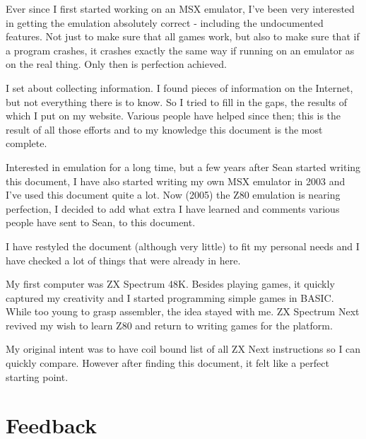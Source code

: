 \documentclass[twoside,openright,a4paper]{book}
\begin{document}
\begin{description}[style=unboxed,leftmargin=0cm]

	\item[Sean]\hfill
	
	Ever since I first started working on an MSX emulator, I've been very interested in getting the emulation absolutely correct - including the undocumented features. Not just to make sure that all games work, but also to make sure that if a program crashes, it crashes exactly the same way if running on an emulator as on the real thing. Only then is perfection achieved.

	I set about collecting information. I found pieces of information on the Internet, but not everything there is to know. So I tried to fill in the gaps, the results of which I put on my website. Various people have helped since then; this is the result of all those efforts and to my knowledge this document is the most complete.

	\item[Jan]\hfill

	Interested in emulation for a long time, but a few years after Sean started writing this document, I have also started writing my own MSX emulator in 2003 and I've used this document quite a lot. Now (2005) the Z80 emulation is nearing perfection, I decided to add what extra I have learned and comments various people have sent to Sean, to this document.

	I have restyled the document (although very little) to fit my personal needs and I have checked a lot of things that were already in here.

	\item[Tomaz]\hfill
	
	My first computer was ZX Spectrum 48K. Besides playing games, it quickly captured my creativity and I started programming simple games in BASIC. While too young to grasp assembler, the idea stayed with me. ZX Spectrum Next revived my wish to learn Z80 and return to writing games for the platform.
	
	My original intent was to have coil bound list of all ZX Next instructions so I can quickly compare. However after finding this document, it felt like a perfect starting point.
 
\end{description}


\section{Feedback}
\end{document}
